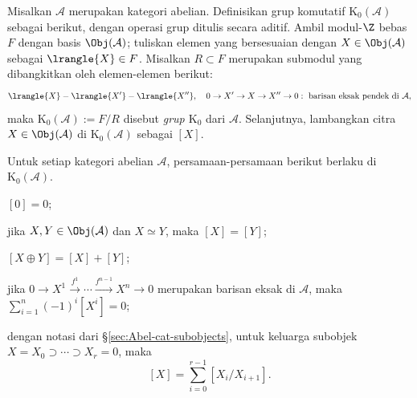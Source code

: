 \begin{definisi}\label{def:K0}
Misalkan $\mathcal{A}$ merupakan kategori abelian. Definisikan grup komutatif
$\mathrm{K}_0(\mathcal{A})$ sebagai berikut, dengan operasi grup ditulis secara
aditif. Ambil modul-$\Z$ bebas $F$ dengan basis
$\Obj(\mathcal{A})$; tuliskan elemen yang bersesuaian dengan
$X\in\Obj(\mathcal{A})$ sebagai $\lrangle{X}\in F$. Misalkan $R\subset F$
merupakan submodul yang dibangkitkan oleh elemen-elemen berikut:
\[\lrangle{X}-\lrangle{X'}-\lrangle{X''},\quad
0\to X'\to X\to X''\to0:\ \text{barisan eksak pendek di }\mathcal{A},\]
maka $\mathrm{K}_0(\mathcal{A}):=F/R$ disebut \emph{grup $\mathrm{K}_0$}
dari $\mathcal{A}$. Selanjutnya, lambangkan citra
$X\in\Obj(\mathcal{A})$ di $\mathrm{K}_0(\mathcal{A})$ sebagai $[X]$.
\end{definisi}

\begin{lema}\label{prop:K0-prep}
Untuk setiap kategori abelian $\mathcal{A}$, persamaan-persamaan berikut
berlaku di $\mathrm{K}_0(\mathcal{A})$.
\begin{compactenum}[(i)]
	\item $[0]=0$;
	\item jika $X,Y\in\Obj(\mathcal{A})$ dan $X\simeq Y$, maka $[X]=[Y]$;
	\item $[X\oplus Y]=[X]+[Y]$;
	\item jika
	$0\to X^1\xrightarrow{f^1}\cdots\xrightarrow{f^{n-1}}X^n\to0$
	merupakan barisan eksak di $\mathcal{A}$, maka
	$\sum_{i=1}^{n}(-1)^i[X^i]=0$;
	\item dengan notasi dari \S\ref{sec:Abel-cat-subobjects}, untuk
	keluarga subobjek $X=X_0\supset\cdots\supset X_r=0$, maka
	\[[X]=\sum_{i=0}^{r-1}[X_i/X_{i+1}].\]
\end{compactenum}
\end{lema}

